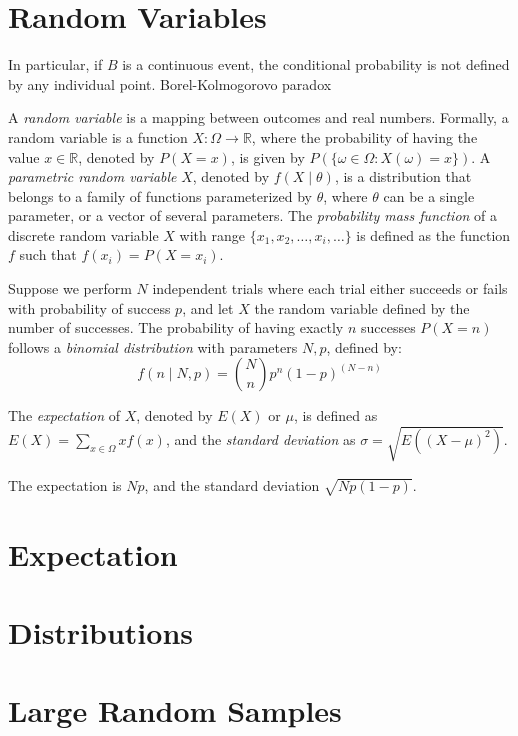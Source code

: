 %
%

\section{Random Variables}
\label{sec:probability_random_variables}

{\color{red} In particular, if $B$ is a continuous event, the conditional probability is not defined by any individual point. Borel-Kolmogorovo paradox}


A \emph{random variable} is a mapping between outcomes and real numbers. Formally, a random variable is a function $X : \Omega \rightarrow \mathbb{R}$, where the probability of having the value $x \in \mathbb{R}$, denoted by $P(X=x)$, is given by $P(\{ \omega \in \Omega : X(\omega) = x\})$. A \emph{parametric random variable} $X$, denoted by $f\left(X \mid \theta \right)$, is a distribution that belongs to a family of functions parameterized by $\theta$, where $\theta$ can be a single parameter, or a vector of several parameters. The \emph{probability mass function} of a discrete random variable $X$ with range $\{ x_1, x_2, \ldots, x_i, \ldots \}$ is defined as the function $f$ such that $f(x_i) = P(X=x_i)$.

\begin{example}
Suppose we perform $N$ independent trials where each trial either succeeds or fails with probability of success $p$, and let $X$ the random variable defined by the number of successes. The probability of having exactly $n$ successes $P(X=n)$ follows a \emph{binomial distribution} with parameters $N, p$, defined by:
\[
f(n\mid N, p) = \binom{N}{n} p^n (1-p)^{(N-n)}
\]
\end{example}

The \emph{expectation} of $X$, denoted by $E(X)$ or $\mu$, is defined as $E(X) = \sum_{x \in \Omega} x f(x)$, and the \emph{standard deviation} as $\sigma = \sqrt{E \left( (X - \mu)^2 \right)}$.

\begin{example}
The expectation is $Np$, and the standard deviation $\sqrt{Np(1-p)}$.
\end{example}

%
%

\section{Expectation}
\label{sec:probability_expectation}


%
%

\section{Distributions}
\label{sec:probability_distributions}


%
%

\section{Large Random Samples}
\label{sec:probability_random_samples}

